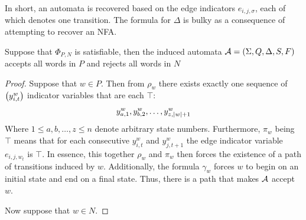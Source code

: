 In short, an automata is recovered based on the edge indicators
\(e_{i, j, \sigma}\),
each of which denotes one transition.
The formula for \(\Delta\) is bulky as a consequence of attempting to
recover an NFA.

\begin{theorem}
  Suppose that \(\Phi_{P, N}\) is satisfiable,
  then the induced automata \(\mathcal{A} = \left(\Sigma, Q, \Delta, S, F\right)\)
  accepts all words in \(P\) and rejects all words in \(N\)
\end{theorem}
\begin{proof}
  Suppose that \(w \in P\).
  Then from \(\rho_w\)
  there exists exactly one sequence of \(\left(y_{i, t}^w\right)\)
  indicator variables that are each \(\top\):
  \begin{align*}
    y_{a, 1}^w, y_{b, 2}^w, \ldots, y_{z, \left\lvert w\right\rvert + 1}^w
  \end{align*}
  Where \(1 \leq a, b, \ldots, z \leq n\) denote arbitrary state numbers.
  Furthermore, \(\pi_w\) being \(\top\) means that for each consecutive
  \(y_{i, t}^w\) and \(y_{j, t + 1}^w\) the edge indicator variable
  \(e_{i, j, w_{t}}\) is \(\top\).
  In essence, this together \(\rho_w\) and \(\pi_w\) then forces
  the existence of a path of transitions induced by \(w\).
  Additionally, the formula \(\gamma_w\) forces \(w\) to begin on an
  initial state and end on a final state.
  Thus, there is a path that makes \(\mathcal{A}\) accept \(w\).



  Now suppose that \(w \in N\).

\end{proof}



